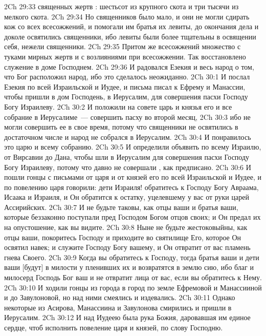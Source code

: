 \vs 2Ch 29:33  священных жертв : шестьсот из крупного скота и три тысячи из мелкого скота.
\vs 2Ch 29:34 Но священников было мало, и они не могли сдирать кож со всех всесожжений, и помогали им братья их левиты, до окончания дела и доколе освятились  священники, ибо левиты были более тщательны в освящении себя, нежели священники.
\vs 2Ch 29:35 Притом же всесожжений  множество с туками мирных жертв и с возлияниями при всесожжении. Так восстановлено служение в доме Господнем.
\vs 2Ch 29:36 И радовался Езекия и весь народ о том, что Бог  расположил народ, ибо это сделалось неожиданно.
\vs 2Ch 30:1 И послал Езекия по всей  Израильской и Иудее, и письма писал к Ефрему и Манассии, чтобы пришли в дом Господень, в Иерусалим, для совершения пасхи Господу Богу Израилеву.
\vs 2Ch 30:2 И положили на совете царь и князья его и все собрание в Иерусалиме~--- совершить пасху во второй месяц,
\vs 2Ch 30:3 ибо не могли совершить ее в свое время, потому что священники  не освятились в достаточном числе и народ не собрался в Иерусалим.
\vs 2Ch 30:4 И понравилось это царю и всему собранию.
\vs 2Ch 30:5 И определили объявить по всему Израилю, от Вирсавии до Дана, чтобы шли в Иерусалим для совершения пасхи Господу Богу Израилеву, потому что давно не совершали , как предписано.
\vs 2Ch 30:6 И пошли гонцы с письмами от царя и от князей его по всей  Израильской и Иудее, и по повелению царя говорили: дети Израиля! обратитесь к Господу Богу Авраама, Исаака и Израиля, и Он обратится к остатку, уцелевшему у вас от руки царей Ассирийских.
\vs 2Ch 30:7 И не будьте таковы, как отцы ваши и братья ваши, которые беззаконно поступали пред Господом Богом отцов своих; и Он предал их на опустошение, как вы видите.
\vs 2Ch 30:8 Ныне не будьте жестоковыйны, как отцы ваши, покоритесь Господу и приходите во святилище Его, которое Он освятил навек; и служите Господу Богу вашему, и Он отвратит от вас пламень гнева Своего.
\vs 2Ch 30:9 Когда вы обратитесь к Господу, тогда братья ваши и дети ваши [будут] в милости у пленивших их и возвратятся в землю сию, ибо благ и милосерд Господь Бог ваш и не отвратит лица от вас, если вы обратитесь к Нему.
\vs 2Ch 30:10 И ходили гонцы из города в город по земле Ефремовой и Манассииной и до Завулоновой, но над ними смеялись и издевались.
\vs 2Ch 30:11 Однако некоторые из  Асирова, Манассиина и Завулонова смирились и пришли в Иерусалим.
\vs 2Ch 30:12 И над Иудеею была рука Божия, даровавшая им единое сердце, чтоб исполнить повеление царя и князей, по слову Господню.
